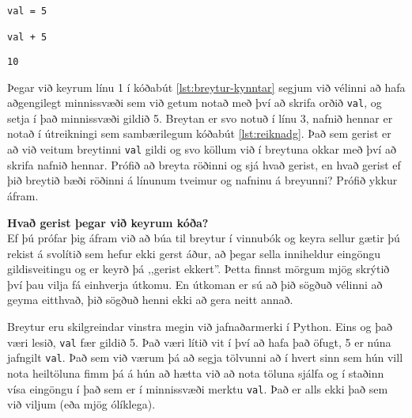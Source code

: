 \begin{lstlisting}[caption=Breytur kynntar, label=lst:breytur-kynntar]
val = 5

val + 5
\end{lstlisting}
\lstset{style=uttak}
\begin{lstlisting}
10
\end{lstlisting}
\lstset{style=venjulegt}

Þegar við keyrum línu 1 í kóðabút \ref{lst:breytur-kynntar} segjum við vélinni að hafa aðgengilegt minnissvæði sem við getum notað með því að skrifa orðið \texttt{val}, og setja í það minnissvæði gildið 5.
Breytan er svo notuð í línu 3, nafnið hennar er notað í útreikningi sem sambærilegum kóðabút \ref{lst:reiknadg}.
Það sem gerist er að við veitum breytinni \texttt{val} gildi og svo köllum við í breytuna okkar með því að skrifa nafnið hennar.
Prófið að breyta röðinni og sjá hvað gerist, en hvað gerist ef þið breytið bæði röðinni á línunum tveimur og nafninu á breyunni?
Prófið ykkur áfram.

\begin{itarefni}
\textbf{Hvað gerist þegar við keyrum kóða?}\\
Ef þú prófar þig áfram við að búa til breytur í vinnubók og keyra sellur gætir þú rekist á svolítið sem hefur ekki gerst áður, að þegar sella inniheldur eingöngu gildisveitingu og er keyrð þá ,,gerist ekkert''.
Þetta finnst mörgum mjög skrýtið því þau vilja fá einhverja útkomu.
En útkoman er sú að þið sögðuð vélinni að geyma eitthvað, þið sögðuð henni ekki að gera neitt annað.	
\end{itarefni}

Breytur eru skilgreindar vinstra megin við jafnaðarmerki í Python.
Eins og það væri lesið, \texttt{val} fær gildið 5.
Það væri lítið vit í því að hafa það öfugt, 5 er núna jafngilt \texttt{val}.
Það sem við værum þá að segja tölvunni að í hvert sinn sem hún vill nota heiltöluna fimm þá á hún að hætta við að nota töluna sjálfa og í staðinn vísa eingöngu í það sem er í minnissvæði merktu \texttt{val}.
Það er alls ekki það sem við viljum (eða mjög ólíklega).

\vspace{0.3cm}

